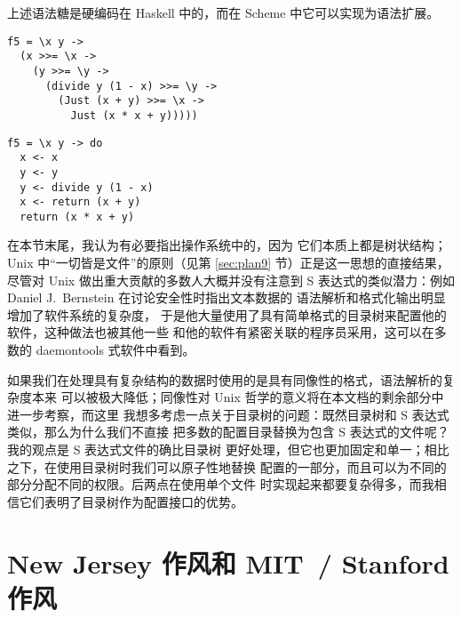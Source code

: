 上述语法糖是硬编码在 Haskell 中的，而在 Scheme 中它可以实现为语法扩展。
\pagebreak
\colskipa\begin{multicols}{2}
\begin{wquoting}
\begin{Verbatim}
f5 = \x y ->
  (x >>= \x ->
    (y >>= \y ->
      (divide y (1 - x) >>= \y ->
        (Just (x + y) >>= \x ->
          Just (x * x + y)))))
\end{Verbatim}
\end{wquoting}
\begin{wquoting}
\begin{Verbatim}
f5 = \x y -> do
  x <- x
  y <- y
  y <- divide y (1 - x)
  x <- return (x + y)
  return (x * x + y)
\end{Verbatim}
\end{wquoting}
\end{multicols}\colskipb

在本节末尾，我认为有必要指出操作系统中的，因为
它们本质上都是树状结构；Unix 中“一切皆是文件”的原则（见第 \ref{sec:plan9}
节）正是这一思想的直接结果，尽管对 Unix 做出重大贡献的多数人大概并没有注意到
S 表达式的类似潜力：例如 Daniel J.\ Bernstein 在讨论安全性时指出文本数据的
语法解析和格式化输出明显增加了软件系统的复杂度，
于是他大量使用了具有简单格式的目录树来配置他的软件，这种做法也被其他一些
和他的软件有紧密关联的程序员采用，这可以在多数的 daemontools 式软件中看到。

如果我们在处理具有复杂结构的数据时使用的是具有同像性的格式，语法解析的复杂度本来
可以被极大降低；同像性对 Unix 哲学的意义将在本文档的剩余部分中进一步考察，而这里
我想多考虑一点关于目录树的问题：既然目录树和 S 表达式类似，那么为什么我们不直接
把多数的配置目录替换为包含 S 表达式的文件呢？我的观点是 S 表达式文件的确比目录树
更好处理，但它也更加固定和单一；相比之下，在使用目录树时我们可以原子性地替换
配置的一部分，而且可以为不同的部分分配不同的权限。后两点在使用单个文件
时实现起来都要复杂得多，而我相信它们表明了目录树作为配置接口的优势。

\section{New Jersey 作风和 MIT~/ Stanford 作风}\label{sec:wib}

